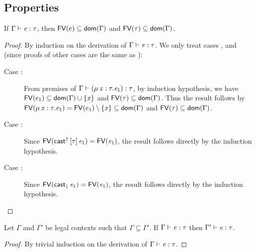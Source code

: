\subsection{Properties}
\begin{lem}\label{lem:appendix:free}
    If $\Gamma  \vdash  \mathit{e}  :  \tau$, then $\mathsf{FV}(e) \subseteq \mathsf{dom}(\Gamma)$ and $\mathsf{FV}(\tau)
\subseteq \mathsf{dom}(\Gamma)$.
\end{lem}

\begin{proof}
    By induction on the derivation of $\Gamma  \vdash  \mathit{e}  :  \tau$. We only treat cases
,  and  (since proofs of
other cases are the same as \cc \cite{handbook}):
    \begin{description}
        \item[Case :] From premises of $\Gamma  \vdash  (  \mu \, \mathit{x}  :  \tau  .  \mathit{e_{{\mathrm{1}}}}  )  :  \tau$, by induction hypothesis, we have $\mathsf{FV}(e_1) \subseteq \mathsf{dom}(\Gamma) \cup
\{\mathit{x}\}$ and $\mathsf{FV}(\tau) \subseteq \mathsf{dom}(\Gamma)$. Thus the result follows by
$\mathsf{FV}(\mu \, \mathit{x}  :  \tau  .  \mathit{e_{{\mathrm{1}}}})=\mathsf{FV}(e_1) \setminus \{\mathit{x}\} \subseteq \mathsf{dom}(\Gamma)$ and
$\mathsf{FV}(\tau) \subseteq \mathsf{dom}(\Gamma)$.
        \item[Case :] Since $\mathsf{FV}(\mathsf{cast}^{\uparrow} \, [  \tau  ] \,  \mathit{e_{{\mathrm{1}}}})=\mathsf{FV}(\mathit{e_{{\mathrm{1}}}})$, the result follows directly by the induction hypothesis.
        \item[Case :] Since $\mathsf{FV}(\mathsf{cast}_{\downarrow} \, \mathit{e_{{\mathrm{1}}}})=\mathsf{FV}(\mathit{e_{{\mathrm{1}}}})$, the result follows directly by the induction hypothesis.
    \end{description}
\end{proof}

\begin{lem}[Thinning]\label{lem:appendix:thin}
    Let $\Gamma$ and $\Gamma'$ be legal contexts such that $\Gamma \subseteq
\Gamma'$. If $\Gamma  \vdash  \mathit{e}  :  \tau$ then $\Gamma'  \vdash  \mathit{e}  :  \tau$.
\end{lem}

\begin{proof}
    By trivial induction on the derivation of $\Gamma  \vdash  \mathit{e}  :  \tau$.
\end{proof}

